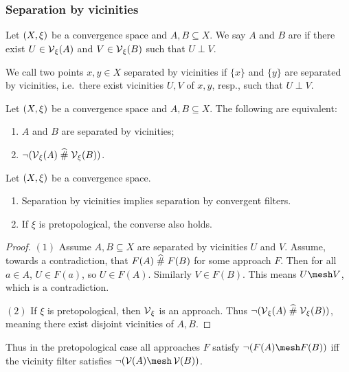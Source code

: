 \subsubsection{Separation by vicinities}
\begin{definition}
Let $\left( X,\xi \right)$ be a convergence space and $A,B\subseteq X$. We say $A$ and $B$ are  if there exist $U\in \operatorname{\mathcal{V}}_\xi(A)$ and $V\in\operatorname{\mathcal{V}}_\xi(B)$ such that $U\perp V$.

We call two points $x,y\in X$ separated by vicinities if $\{x\}$ and $\{y\}$ are separated by vicinities, i.e.\ there exist vicinities $U,V$ of $x,y$, resp., such that $U\perp V$.
\end{definition}

\begin{lemma}
Let $\left( X,\xi \right)$ be a convergence space and $A,B\subseteq X$. The following are equivalent:
\begin{enumerate}
\item $A$ and $B$ are separated by vicinities;
\item $\neg(\operatorname{\mathcal{V}}_\xi(A)\mathrel{\widehat{\#}} \operatorname{\mathcal{V}}_\xi(B))$.
\end{enumerate}
\end{lemma}

\begin{proposition} \label{disjointVicinitiesConvergentFilterSeparation}
Let $\left( X,\xi \right)$ be a convergence space.
\begin{enumerate}
\item Separation by vicinities implies separation by convergent filters.
\item If $\xi$ is pretopological, the converse also holds.
\end{enumerate}
\end{proposition}
\begin{proof}
$(1)$ Assume $A,B\subseteq X$ are separated by vicinities $U$ and $V$. Assume, towards a contradiction, that $F(A)\mathrel{\widehat{\#}} F(B)$ for some approach $F$. Then for all $a\in A$, $U\in F(a)$, so $U\in F(A)$. Similarly $V\in F(B)$. This means $U\mesh V$, which is a contradiction.

$(2)$ If $\xi$ is pretopological, then $\operatorname{\mathcal{V}}_\xi$ is an approach. Thus $\neg(\operatorname{\mathcal{V}}_\xi(A)\mathrel{\widehat{\#}} \operatorname{\mathcal{V}}_\xi(B))$, meaning there exist disjoint vicinities of $A,B$.
\end{proof}
Thus in the pretopological case all approaches $F$ satisfy $\neg(F(A)\mesh F(B))$ iff the vicinity filter satisfies $\neg(\vicinity(A)\mesh \vicinity(B))$.


